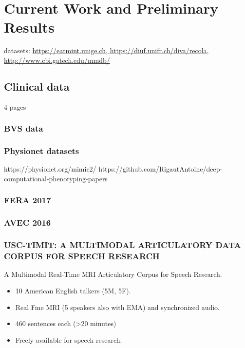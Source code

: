 \chapter{Current Work and Preliminary Results}
\label{cha:currentWork}
datasets: \url{https://eatmint.unige.ch},\url{ https://diuf.unifr.ch/diva/recola}, \url{ http://www.cbi.gatech.edu/mmdb/}

\section{Clinical data}

4 pages

\subsection{BVS data}

\subsection{Physionet datasets}


https://physionet.org/mimic2/
https://github.com/RigautAntoine/deep-computational-phenotyping-papers

\subsection{FERA 2017}

\subsection{AVEC 2016}
 
\subsection{USC-TIMIT: A MULTIMODAL ARTICULATORY DATA CORPUS FOR SPEECH RESEARCH}

A Multimodal Real-Time MRI Articulatory Corpus for Speech Research.
\begin{itemize}
    \item 10 American English talkers (5M, 5F).
    \item Real Fme MRI (5 speakers also with EMA)
and synchronized audio.
    \item 460 sentences each (>20 minutes)
    \item Freely available for speech research.
\end{itemize}


